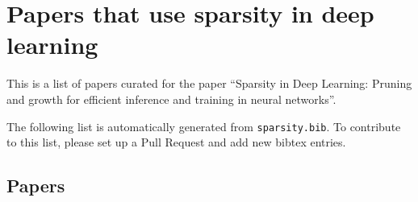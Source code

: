 \documentclass{article}
\begin{document}
\section{Papers that use sparsity in deep learning}
This is a list of papers curated for the paper ``Sparsity in Deep Learning: Pruning and growth for efficient inference and training in neural networks''.

The following list is automatically generated from \texttt{sparsity.bib}. To contribute to this list, please set up a Pull Request and add new bibtex entries.

\subsection{Papers}

\nocite{*}
\printbibliography
\end{document}

